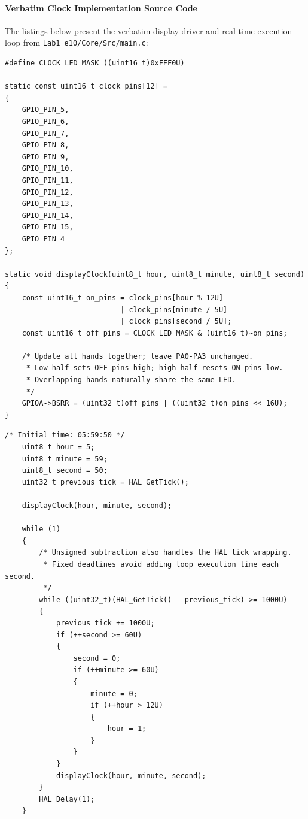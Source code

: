 \documentclass[oneside,final]{hcmut-report}
\begin{document}
\paragraph{Verbatim Clock Implementation Source Code}
The listings below present the verbatim display driver and real-time execution loop from \texttt{Lab1\_e10/Core/Src/main.c}:

\begin{lstlisting}[caption={[Clock display and atomic BSRR driver]{Clock display and atomic BSRR driver (Lab1\_e10/Core/Src/main.c)}},label={lst:ex10_driver},basicstyle=\fontsize{6.8pt}{7.5pt}\ttfamily,lineskip=0pt,aboveskip=0pt,belowskip=0pt]
#define CLOCK_LED_MASK ((uint16_t)0xFFF0U)

static const uint16_t clock_pins[12] =
{
    GPIO_PIN_5,
    GPIO_PIN_6,
    GPIO_PIN_7,
    GPIO_PIN_8,
    GPIO_PIN_9,
    GPIO_PIN_10,
    GPIO_PIN_11,
    GPIO_PIN_12,
    GPIO_PIN_13,
    GPIO_PIN_14,
    GPIO_PIN_15,
    GPIO_PIN_4
};

static void displayClock(uint8_t hour, uint8_t minute, uint8_t second)
{
    const uint16_t on_pins = clock_pins[hour % 12U]
                           | clock_pins[minute / 5U]
                           | clock_pins[second / 5U];
    const uint16_t off_pins = CLOCK_LED_MASK & (uint16_t)~on_pins;

    /* Update all hands together; leave PA0-PA3 unchanged.
     * Low half sets OFF pins high; high half resets ON pins low.
     * Overlapping hands naturally share the same LED.
     */
    GPIOA->BSRR = (uint32_t)off_pins | ((uint32_t)on_pins << 16U);
}
\end{lstlisting}

\begin{lstlisting}[caption={[Real-time tick loop with rollover]{Real-time tick loop with rollover management (Lab1\_e10/Core/Src/main.c)}},label={lst:ex10_loop},basicstyle=\fontsize{6.8pt}{7.5pt}\ttfamily,lineskip=0pt,aboveskip=0pt,belowskip=0pt]
    /* Initial time: 05:59:50 */
    uint8_t hour = 5;
    uint8_t minute = 59;
    uint8_t second = 50;
    uint32_t previous_tick = HAL_GetTick();

    displayClock(hour, minute, second);

    while (1)
    {
        /* Unsigned subtraction also handles the HAL tick wrapping.
         * Fixed deadlines avoid adding loop execution time each second.
         */
        while ((uint32_t)(HAL_GetTick() - previous_tick) >= 1000U)
        {
            previous_tick += 1000U;
            if (++second >= 60U)
            {
                second = 0;
                if (++minute >= 60U)
                {
                    minute = 0;
                    if (++hour > 12U)
                    {
                        hour = 1;
                    }
                }
            }
            displayClock(hour, minute, second);
        }
        HAL_Delay(1);
    }
\end{lstlisting}
\end{document}
